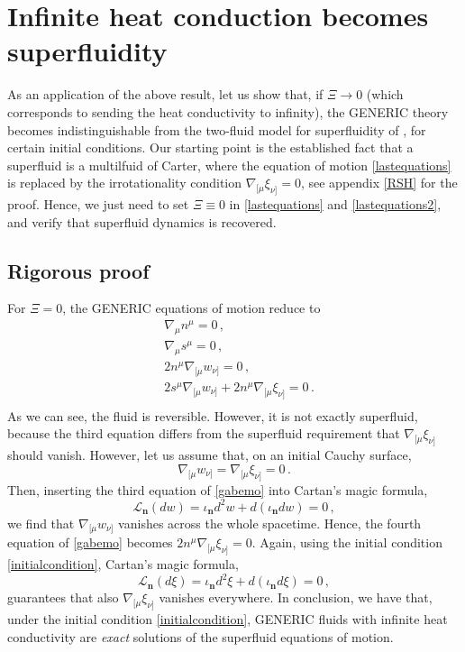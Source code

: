 \documentclass[a4paper, amsfonts, amssymb, amsmath, reprint, showkeys, nofootinbib, twoside, onecolumn, notitlepage]{revtex4-1}
\begin{document}
\section{Infinite heat conduction becomes superfluidity}\label{ernvmcoefc}

As an application of the above result, let us show that, if $\Xi \rightarrow 0$ (which corresponds to sending the heat conductivity to infinity), the GENERIC theory becomes indistinguishable from the two-fluid model for superfluidity of  \citet{Son2001}, for certain initial conditions. Our starting point is the established fact \cite{Termo} that a superfluid is a multilfuid of Carter, where the equation of motion \eqref{lastequations} is replaced by the irrotationality condition $\nabla_{[\mu}\xi_{\nu]}=0$, see appendix \ref{RSH} for the proof. Hence, we just need to set $\Xi\equiv 0$ in \eqref{lastequations} and \eqref{lastequations2}, and verify that superfluid dynamics is recovered.

\subsection{Rigorous proof}

For $\Xi=0$, the GENERIC equations of motion reduce to
\begin{equation}\label{gabemo}
\begin{split}
&\nabla_\mu n^\mu = 0 \, , \\
&\nabla_\mu s^\mu = 0 \, , \\
&2n^\mu \nabla_{[\mu}w_{\nu]} = 0 \, , \\
& 2s^\mu \nabla_{[\mu} w_{\nu]}+2n^\mu \nabla_{[\mu}\xi_{\nu]}=0 \, . \\
\end{split}
\end{equation}
As we can see, the fluid is reversible. However, it is not exactly superfluid, because the third equation differs from the superfluid requirement that $\nabla_{[\mu}\xi_{\nu]}$ should vanish. However, let us assume that, on an initial Cauchy surface,
\begin{equation}\label{initialcondition}
\nabla_{[\mu}w_{\nu]}=\nabla_{[\mu}\xi_{\nu]}=0 \, .
\end{equation}
Then, inserting the third equation of \eqref{gabemo} into Cartan's magic formula,
\begin{equation}
\mathcal{L}_{\textbf{n}}(dw)= \iota_{\textbf{n}} d^2 w+d(\iota_\textbf{n}dw)=0 \, ,
\end{equation}
we find that $\nabla_{[\mu}w_{\nu]}$ vanishes across the whole spacetime. Hence, the fourth equation of \eqref{gabemo} becomes $2n^\mu \nabla_{[\mu}\xi_{\nu]}=0$. Again, using the initial condition \eqref{initialcondition}, Cartan's magic formula,
\begin{equation}
\mathcal{L}_{\textbf{n}}(d\xi)= \iota_{\textbf{n}} d^2 \xi+d(\iota_\textbf{n}d\xi)=0 \, ,
\end{equation}
guarantees that also $\nabla_{[\mu}\xi_{\nu]}$ vanishes everywhere. In conclusion, we have that, under the initial condition \eqref{initialcondition}, GENERIC fluids with infinite heat conductivity are \textit{exact} solutions of the superfluid equations of motion.
\end{document}
